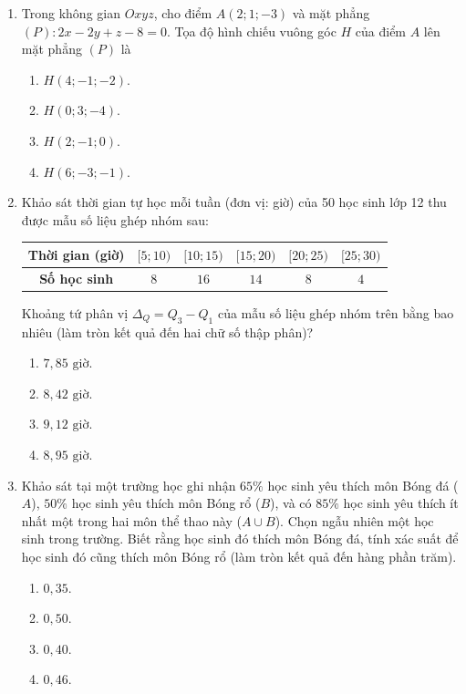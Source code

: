 \documentclass[12pt,a4paper]{article}
\begin{document}
\begin{enumerate}[label=\textbf{Câu \arabic*:}, leftmargin=*]
\item Trong không gian $Oxyz$, cho điểm $A(2; 1; -3)$ và mặt phẳng $(P): 2x - 2y + z - 8 = 0$. Tọa độ hình chiếu vuông góc $H$ của điểm $A$ lên mặt phẳng $(P)$ là
\begin{enumerate}[label=\Alph*.]
    \item $H(4; -1; -2)$.
    \item $H(0; 3; -4)$.
    \item $H(2; -1; 0)$.
    \item $H(6; -3; -1)$.
\end{enumerate}

\item Khảo sát thời gian tự học mỗi tuần (đơn vị: giờ) của 50 học sinh lớp 12 thu được mẫu số liệu ghép nhóm sau:
\begin{center}
\begin{tabular}{|c|c|c|c|c|c|}
\hline
\textbf{Thời gian (giờ)} & $[5; 10)$ & $[10; 15)$ & $[15; 20)$ & $[20; 25)$ & $[25; 30)$ \\ \hline
\textbf{Số học sinh} & $8$ & $16$ & $14$ & $8$ & $4$ \\ \hline
\end{tabular}
\end{center}
Khoảng tứ phân vị $\Delta_Q = Q_3 - Q_1$ của mẫu số liệu ghép nhóm trên bằng bao nhiêu (làm tròn kết quả đến hai chữ số thập phân)?
\begin{enumerate}[label=\Alph*.]
    \item $7{,}85\text{ giờ}$.
    \item $8{,}42\text{ giờ}$.
    \item $9{,}12\text{ giờ}$.
    \item $8{,}95\text{ giờ}$.
\end{enumerate}

\item Khảo sát tại một trường học ghi nhận $65\%$ học sinh yêu thích môn Bóng đá ($A$), $50\%$ học sinh yêu thích môn Bóng rổ ($B$), và có $85\%$ học sinh yêu thích ít nhất một trong hai môn thể thao này ($A \cup B$). Chọn ngẫu nhiên một học sinh trong trường. Biết rằng học sinh đó thích môn Bóng đá, tính xác suất để học sinh đó cũng thích môn Bóng rổ (làm tròn kết quả đến hàng phần trăm).
\begin{enumerate}[label=\Alph*.]
    \item $0{,}35$.
    \item $0{,}50$.
    \item $0{,}40$.
    \item $0{,}46$.
\end{enumerate}


\end{enumerate}
\end{document}
